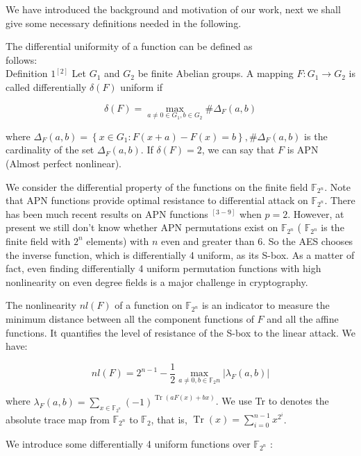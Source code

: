 \documentclass[10pt]{article}
\begin{document}
We have introduced the background and motivation of our work, next we shall give some necessary definitions needed in the following.

The differential uniformity of a function can be defined as\\
follows:\\
Definition $1{ }^{[2]}$ Let $G_{1}$ and $G_{2}$ be finite Abelian groups. A mapping $F: G_{1} \rightarrow G_{2}$ is called differentially $\delta(F)$ uniform if

$$
\delta(F)=\max _{a \neq 0 \in G_{1}, b \in G_{2}} \# \Delta_{F}(a, b)
$$

where $\Delta_{F}(a, b)=\left\{x \in G_{1}: F(x+a)-F(x)=b\right\}, \# \Delta_{F}(a, b)$ is the cardinality of the set $\Delta_{F}(a, b)$. If $\delta(F)=2$, we can say that $F$ is APN (Almost perfect nonlinear).

We consider the differential property of the functions on the finite field $\mathbb{F}_{2^{n}}$. Note that APN functions provide optimal resistance to differential attack on $\mathbb{F}_{2^{n}}$. There has been much recent results on APN functions ${ }^{[3-9]}$ when $p=2$. However, at present we still don't know whether APN permutations exist on $\mathbb{F}_{2^{n}}$ ( $\mathbb{F}_{2^{n}}$ is the finite field with $2^{n}$ elements) with $n$ even and greater than 6. So the AES chooses the inverse function, which is differentially 4 uniform, as its S-box. As a matter of fact, even finding differentially 4 uniform permutation functions with high nonlinearity on even degree fields is a major challenge in cryptography.

The nonlinearity $n l(F)$ of a function on $\mathbb{F}_{2^{n}}$ is an indicator to measure the minimum distance between all the component functions of $F$ and all the affine functions. It quantifies the level of resistance of the S-box to the linear attack. We have:


\begin{equation*}
n l(F)=2^{n-1}-\frac{1}{2} \max _{a \neq 0, b \in \mathbb{F}_{2} n}\left|\lambda_{F}(a, b)\right| \tag{1}
\end{equation*}


where $\lambda_{F}(a, b)=\sum_{x \in \mathbb{F}_{2^{n}}}(-1)^{\operatorname{Tr}(a F(x)+b x)}$. We use Tr to denotes the absolute trace map from $\mathbb{F}_{2^{n}}$ to $\mathbb{F}_{2}$, that is, $\operatorname{Tr}(x)=\sum_{i=0}^{n-1} x^{2^{i}}$.

We introduce some differentially 4 uniform functions over $\mathbb{F}_{2^{n}}$ :
\end{document}
